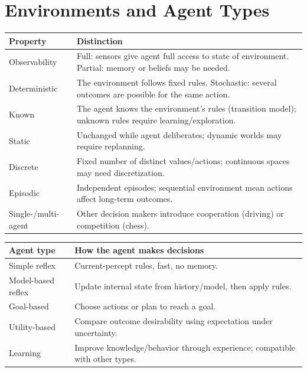 \documentclass{report}
\begin{document}
\section{Environments and Agent Types}
\begin{center}
\begin{tabularx}{\textwidth}{@{}l>{\raggedright\arraybackslash}X@{}}
\toprule
Property & Distinction \\\midrule
Observability & Full: sensors give agent full access to state of environment. Partial: memory or beliefs may be needed.\\
Deterministic & The environment follows fixed rules. Stochastic: several outcomes are possible for the same action.\\
Known & The agent knows the environment's rules (transition model); unknown rules require learning/exploration.\\
Static & Unchanged while agent deliberates; dynamic worlds may require replanning.\\
Discrete & Fixed number of distinct values/actions; continuous spaces may need discretization.\\
Episodic & Independent episodes; sequential environment mean actions affect long-term outcomes.\\
Single-/multi-agent & Other decision makers introduce cooperation (driving) or competition (chess).\\\bottomrule
\end{tabularx}
\end{center}
\begin{center}
\begin{tabularx}{\textwidth}{@{}l>{\raggedright\arraybackslash}X@{}}
\toprule
Agent type & How the agent makes decisions \\\midrule
Simple reflex & Current-percept rules, fast, no memory.\\
Model-based reflex & Update internal state from history/model, then apply rules.\\
Goal-based & Choose actions or plan to reach a goal.\\
Utility-based & Compare outcome desirability using expectation under uncertainty.\\
Learning & Improve knowledge/behavior through experience; compatible with other types.\\\bottomrule
\end{tabularx}
\end{center}
\end{document}
